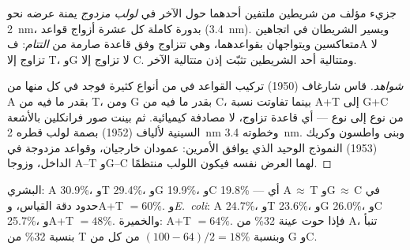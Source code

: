 \begin{proposition}\label{prop:g10:universal-dna:helix}
جزيء  مؤلف من شريطين ملتفين أحدهما حول الآخر في \emph{لولب
مزدوج} يمنة عرضه نحو \qty{2}{nm}، بدورة كاملة كل
عشرة أزواج قواعد (\qty{3.4}{nm}). ويسير الشريطان في اتجاهين متعاكسين
ويتواجهان بقواعدهما، وهي تتزاوج وفق قاعدة صارمة من
\emph{التتام}: فA لا تزاوج إلا T، وG لا تزاوج إلا C.
ومتتالية أحد الشريطين تثبّت إذن متتالية الآخر.
\end{proposition}
\begin{proof}[شواهد]
قاس شارغاف (1950) تركيب القواعد في  من أنواع كثيرة فوجد في كل
منها من A بقدر ما فيه من T، ومن G بقدر ما فيه من C، بينما تفاوتت نسبة
A+T إلى G+C من نوع إلى نوع --- أي قاعدة تزاوج، لا مصادفة كيميائية. ثم
بينت صور فرانكلين بالأشعة السينية لألياف  (1952) بصمة لولب قطره
\qty{2}{nm} وخطوته \qty{3.4}{nm}. وبنى واطسون وكريك (1953) النموذج
الوحيد الذي يوافق الأمرين: عمودان خارجيان، وقواعد مزدوجة في الداخل،
وزوجا A--T وG--C لهما العرض نفسه فيكون اللولب منتظمًا.
\end{proof}

\begin{example}\label{ex:g10:universal-dna:chargaff}
 البشري: A 30.9\%، وT 29.4\%، وG 19.9\%، وC 19.8\% ---
أي A$\,\approx\,$T وG$\,\approx\,$C في حدود دقة القياس، وA+T
$= 60\%$. و\emph{E.~coli}: A 24.7\%، وT 23.6\%، وG 26.0\%، وC 25.7\%،
وA+T $= 48\%$. والخميرة: A+T $= 64\%$. فإذا حوت عينة  32\% من A،
تنبأ  بنسبة 32\% من T وبنسبة $(100 - 64)/2 = 18\%$ من كل من G وC.
\end{example}

